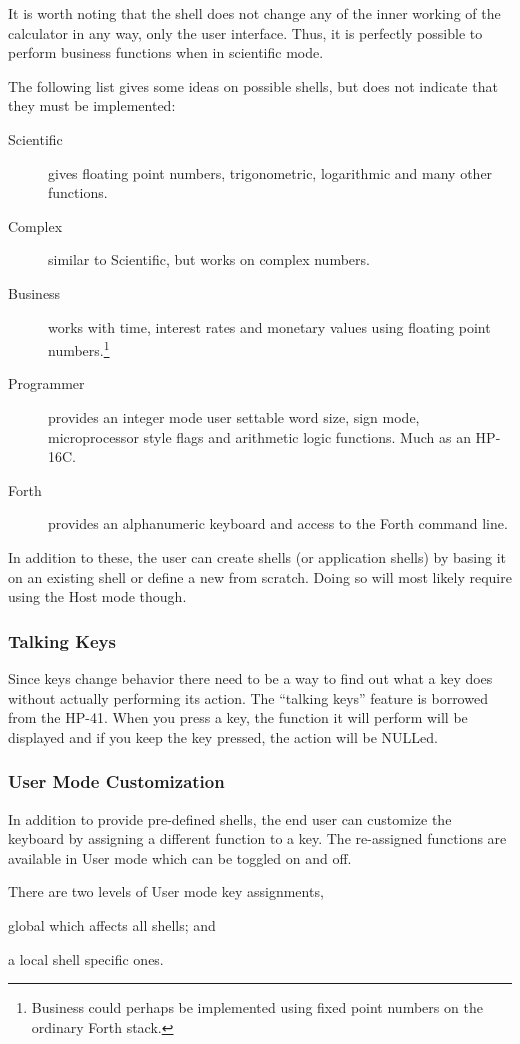 \documentclass[a4paper]{article}
\begin{document}
It is worth noting that the shell does not change any of the inner working of the calculator in any way, only  the user interface. Thus, it is perfectly possible to perform business functions when in scientific mode.

The following list gives some ideas on possible shells, but does not indicate that they must be implemented:
\begin{description}
\item[Scientific] gives floating point numbers, trigonometric, logarithmic and many other functions.
\item[Complex] similar to Scientific, but works on complex numbers.
\item[Business] works with time, interest rates and monetary values using floating point numbers.\footnote{Business could perhaps be implemented using fixed point numbers on the ordinary Forth stack.}
\item[Programmer] provides an integer mode user settable word size, sign mode, microprocessor style flags and arithmetic logic functions. Much as an HP-16C.
\item[Forth] provides an alphanumeric keyboard and access to the Forth command line.
\end{description}

In addition to these, the user can create shells (or application shells) by basing it on an existing shell or define a new from scratch. Doing so will most likely require using the Host mode though.

\subsubsection{Talking Keys}
Since keys change behavior there need to be a way to find out what a key does without actually performing its action. The ``talking keys'' feature is borrowed from the HP-41. When you press a key, the function it will perform will be displayed and if you keep the key pressed, the action will be NULLed.

\subsubsection{User Mode Customization}
In addition to provide pre-defined shells, the end user can customize the keyboard by assigning a different function to a key. The re-assigned functions are available in User mode which can be toggled on and off.

There are two levels of User mode key assignments,
\begin{inparaenum}
\item global which affects all shells;  and
\item a local shell specific ones.
\end{inparaenum}
\end{document}
